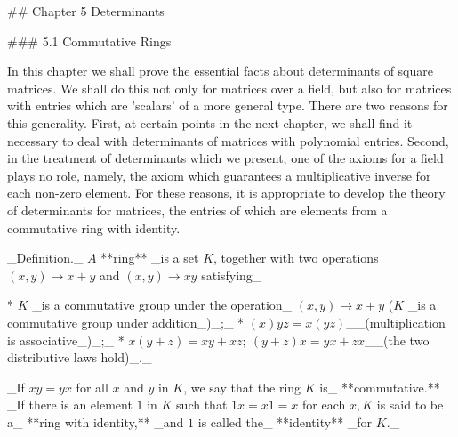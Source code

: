 

## Chapter 5 Determinants

### 5.1 Commutative Rings

In this chapter we shall prove the essential facts about determinants of square matrices. We shall do this not only for matrices over a field, but also for matrices with entries which are 'scalars' of a more general type. There are two reasons for this generality. First, at certain points in the next chapter, we shall find it necessary to deal with determinants of matrices with polynomial entries. Second, in the treatment of determinants which we present, one of the axioms for a field plays no role, namely, the axiom which guarantees a multiplicative inverse for each non-zero element. For these reasons, it is appropriate to develop the theory of determinants for matrices, the entries of which are elements from a commutative ring with identity.

_Definition._ \(A\) **ring** _is a set \(K\), together with two operations \((x,y)\to x+y\) and \((x,y)\to xy\) satisfying_

* \(K\) _is a commutative group under the operation_ \((x,y)\to x+y\) (\(K\) _is a commutative group under addition_)_;_
* \((x)yz=x(yz)\)__(multiplication is associative_)_;_
* \(x(y+z)=xy+xz;\ (y+z)x=yx+zx\)__(the two distributive laws hold)_._

_If \(xy=yx\) for all \(x\) and \(y\) in \(K\), we say that the ring \(K\) is_ **commutative.** _If there is an element \(1\) in \(K\) such that \(1x=x1=x\) for each \(x,\)\(K\) is said to be a_ **ring with identity,** _and \(1\) is called the_ **identity** _for \(K\)._